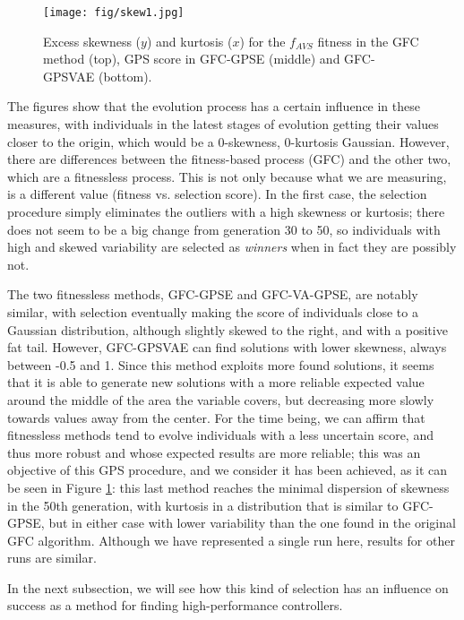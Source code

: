 \documentclass[10pt,journal,compsoc]{IEEEtran}
\begin{document}
\begin{figure}[ht]	
	\begin{center}
		\texttt{[image: fig/skew1.jpg]}
		\caption{Excess skewness ($y$) and kurtosis ($x$)
			for the $f_{AVS}$ fitness in the  {\sf GFC} method \cite{salem_cig2018} (top), GPS score in {\sf GFC-GPSE} (middle) and {\sf GFC-GPSVAE} (bottom).}
		\label{fig:gfcsk}
	\end{center}	
\end{figure}
The figures show that the evolution process has a certain influence in
these measures, with individuals in the latest stages of evolution
getting their values closer to the origin, which would be a 0-skewness, 0-kurtosis
Gaussian. However, there are differences between the fitness-based
process ({\sf GFC}) and the other two, which are a fitnessless process. This is not only because what we are measuring, is a different value (fitness vs. selection score). 
In the first case, the
selection procedure simply eliminates the outliers with a high
skewness or kurtosis; there does not seem to be a big change from
generation 30 to 50, so individuals with  high
and skewed variability are selected as {\em winners} when in fact they
are possibly not.

The two fitnessless methods, {\sf GFC-GPSE} and {\sf GFC-VA-GPSE}, are
notably similar, with selection eventually making the score of
individuals close to a Gaussian distribution, although slightly skewed
to the right, and with a positive fat tail. However, {\sf GFC-GPSVAE} can find solutions with lower skewness, always between -0.5 and
1. Since this method exploits more found solutions, it seems that it
is able to generate new solutions with a more reliable expected value
around the middle of the area the variable covers, but decreasing more
slowly towards values away from the center. For the time being, we can
affirm that fitnessless methods tend to evolve individuals with a less uncertain score, and thus more robust and whose expected
results are more reliable; this was an objective of this GPS
procedure, and we consider it has been achieved, as it can be seen in
Figure \ref{fig:gfcsk}: this last method reaches the minimal
dispersion of skewness in the 50th generation, with kurtosis in a
distribution that is similar to {\sf GFC-GPSE}, but in either case
with lower variability than the one found in the original {\sf GFC} algorithm. Although we have
represented a single run here, results for other runs are similar.

In the next subsection, we will see how this kind of selection has an influence on success as a method for finding high-performance controllers.
\end{document}
